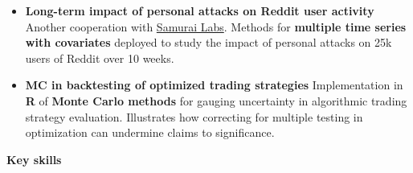 \documentclass[10pt, a4paper]{article}
\begin{document}
\begin{itemize} [leftmargin=*]
\normalsize 
\item %
	\textbf{Long-term impact of personal attacks on Reddit user  activity}%
\newline  \scriptsize  Another cooperation with \href{https://www.samurailabs.ai/}{Samurai Labs}. Methods for \textbf{multiple time series with covariates} deployed to study  the impact of personal attacks on 25k users  of Reddit over 10 weeks.



\normalsize 
\item 	%
	\textbf{MC in backtesting of optimized trading strategies}%
\newline  \scriptsize  Implementation in \textbf{\textsf{R}} of \textbf{Monte Carlo methods} for gauging uncertainty in algorithmic trading strategy evaluation. Illustrates how correcting for multiple testing in optimization can undermine claims to significance.





\end{itemize}




\vspace{2mm}	
\textbf{{\sc \Large Key skills}}\\

\vspace{-4mm}
\end{document}
